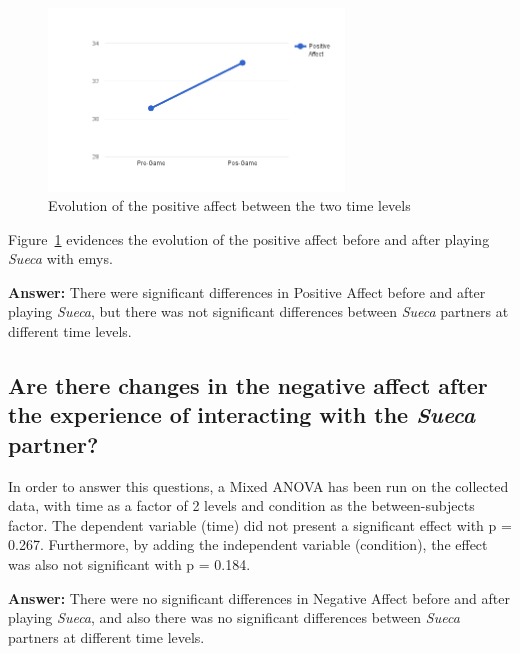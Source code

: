 \begin{figure}[h!]
  \centering
    \includegraphics[width=0.7\textwidth]{./img/6/positiveAffect}
  \caption{Evolution of the positive affect between the two time levels}
\label{fig:positiveAffect}
\end{figure}

Figure~\ref{fig:positiveAffect} evidences the evolution of the positive affect before and after playing \emph{Sueca} with \ac{emys}.

\textbf{Answer:} There were significant differences in Positive Affect before and after playing \emph{Sueca}, but there was not significant differences between \emph{Sueca} partners at different time levels.

\subsection*{Are there changes in the negative affect after the experience of interacting with the \emph{Sueca} partner?}
In order to answer this questions, a Mixed ANOVA has been run on the collected data, with time as a factor of 2 levels and condition as the between-subjects factor.
The dependent variable (time) did not present a significant effect with p = 0.267.
Furthermore, by adding the independent variable (condition), the effect was also not significant with p = 0.184.

\textbf{Answer:} There were no significant differences in Negative Affect before and after playing \emph{Sueca}, and also there was no significant differences between \emph{Sueca} partners at different time levels.

\clearpage
